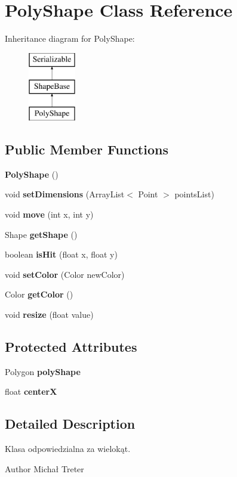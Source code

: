 \section{Poly\+Shape Class Reference}
\label{class_poly_shape}
Inheritance diagram for Poly\+Shape\+:\begin{figure}[H]
\begin{center}
\leavevmode
\includegraphics[height=3.000000cm]{class_poly_shape}
\end{center}
\end{figure}
\subsection*{Public Member Functions}
\begin{DoxyCompactItemize}
\item 
\textbf{ Poly\+Shape} ()
\item 
void \textbf{ set\+Dimensions} (Array\+List$<$ Point $>$ points\+List)
\item 
void \textbf{ move} (int x, int y)
\item 
Shape \textbf{ get\+Shape} ()
\item 
boolean \textbf{ is\+Hit} (float x, float y)
\item 
void \textbf{ set\+Color} (Color new\+Color)
\item 
Color \textbf{ get\+Color} ()
\item 
void \textbf{ resize} (float value)
\end{DoxyCompactItemize}
\subsection*{Protected Attributes}
\begin{DoxyCompactItemize}
\item 
Polygon \textbf{ poly\+Shape}
\item 
float \textbf{ centerX}
\end{DoxyCompactItemize}


\subsection{Detailed Description}
Klasa odpowiedzialna za wielokąt. \begin{DoxyAuthor}{Author}
Michał Treter 
\end{DoxyAuthor}


